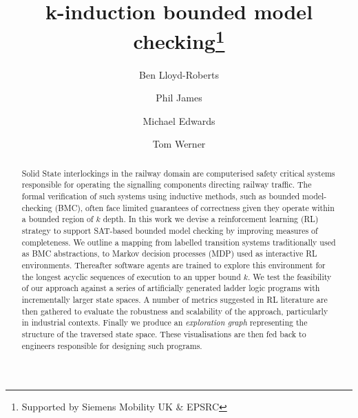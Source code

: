 \documentclass[runningheads]{llncs}
\begin{document}
%
\title{k-induction bounded model checking\thanks{Supported by Siemens Mobility UK \& EPSRC}}
%
%
\author{Ben Lloyd-Roberts \and
Phil James \and
Michael Edwards \and 
Tom Werner}
%
%


%
\maketitle              %
%
\begin{abstract}
Solid State interlockings in the railway domain are computerised safety critical systems responsible for operating the signalling components directing railway traffic. The formal verification of such systems using inductive methods, such as bounded model-checking (BMC), often face limited guarantees of correctness given they operate within a bounded region of $k$ depth. In this work we devise a reinforcement learning (RL) strategy to support SAT-based bounded model checking by improving measures of completeness. We outline a mapping from labelled transition systems traditionally used as BMC abstractions, to Markov decision processes (MDP) used as interactive RL environments. Thereafter software agents are trained to explore this environment for the longest acyclic sequences of execution to an upper bound $k$. We test the feasibility of our approach against a series of artificially generated ladder logic programs with incrementally larger state spaces. A number of metrics suggested in RL literature are then gathered to evaluate the robustness and scalability of the approach, particularly in industrial contexts. Finally we produce an \textit{exploration graph} representing the structure of the traversed state space. These visualisations are then fed back to engineers responsible for designing such programs.

\end{abstract}
\end{document}
